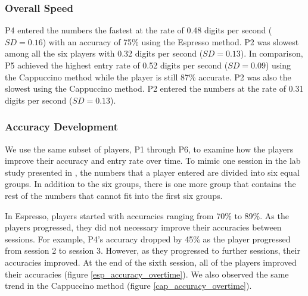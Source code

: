 \subsubsection{Overall Speed}
P4 entered the numbers the fastest at the rate of 0.48 digits per second ($SD=0.16$) with an accuracy of 75\% using the Espresso method. P2 was slowest among all the six players with 0.32 digits per second ($SD=0.13$). In comparison, P5 achieved the highest entry rate of 0.52 digits per second ($SD=0.09$) using the Cappuccino method while the player is still 87\% accurate. P2 was also the slowest using the Cappuccino method. P2 entered the numbers at the rate of 0.31 digits per second ($SD=0.13$).

\subsubsection{Accuracy Development}
We use the same subset of players, P1 through P6, to examine how the players improve their accuracy and entry rate over time. To mimic one session in the lab study presented in \cite{Azenkot:2013}, the numbers that a player entered are divided into six equal groups. In addition to the six groups, there is one more group that contains the rest of the numbers that cannot fit into the first six groups.
\par
In Espresso, players started with accuracies ranging from 70\% to 89\%. As the players progressed, they did not necessary improve their accuracies between sessions. For example, P4's accuracy dropped by 45\% as the player progressed from session 2 to session 3. However, as they progressed to further sessions, their accuracies improved. At the end of the sixth session, all of the players improved their accuracies (figure \ref{esp_accuracy_overtime}). We also observed the same trend in the Cappuccino method (figure \ref{cap_accuracy_overtime}).

